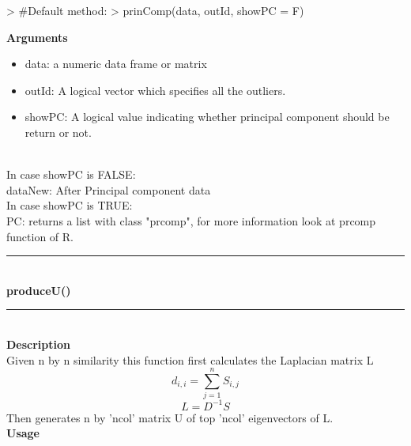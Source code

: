 \documentclass{article}
\begin{document}
\begin{Schunk}
\begin{Sinput}
>   #Default method:
>   prinComp(data, outId, showPC = F)
\end{Sinput}
\end{Schunk}
{\bf Arguments}
\begin {itemize}
\item  data: a numeric data frame or matrix
\item  outId: A logical vector which specifies all the outliers.
\item  showPC: A logical value indicating whether  principal component should be return or not.
\end {itemize}
\hspace*{5mm}{\bf Returns}\\
In case showPC is FALSE:\\
\hspace*{5mm}dataNew: After Principal component data\\
In case showPC is TRUE:\\
\hspace*{5mm}PC: returns a list with class "prcomp", for more information look at prcomp function of R.\\

\noindent\rule{14cm}{0.4pt}\\
{\bf \large produceU()} \\
\noindent\rule{14cm}{0.4pt}\\
{\bf Description}\\
Given n by n similarity this function first calculates the Laplacian matrix L
  $$ d_{i,i}= \sum_{j=1}^{n} S_{i,j}$$
  $$L= D^{-1}S$$
Then generates n by 'ncol' matrix U of top 'ncol' eigenvectors of L. \\

{\bf Usage}\\
\end{document}
